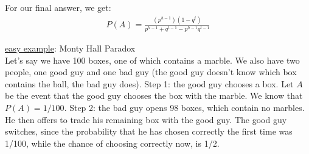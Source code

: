 For our final answer, we get:
\begin{eqnarray*}
P(A) = \frac{(p^{h-1})(1-q^t)}{p^{h-1}+q^{t-1}-p^{h-1}q^{t-1}}
\end{eqnarray*}

\noindent\underline{easy example}:  Monty Hall Paradox\\
Let's say we have 100 boxes, one of which contains a marble.  We also have two people, one good guy and one bad guy (the good guy doesn't know which box contains the ball, the bad guy does).  Step 1:  the good guy chooses a box.  Let $A$ be the event that the good guy chooses the box with the marble.  We know that $P(A)=1/100$.  Step 2:  the bad guy opens 98 boxes, which contain no marbles.  He then offers to trade his remaining box with the good guy.  The good guy switches, since the probability that he has chosen correctly the first time was 1/100, while the chance of choosing correctly now, is 1/2.

